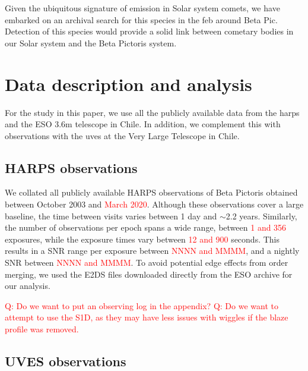 \documentclass{aa}
\newcommand{\bp}{Beta Pictoris}
\begin{document}
Given the ubiquitous signature of  emission in Solar system comets, we have embarked on an archival search for this species in the \ac{feb} around Beta Pic.
%
Detection of this species would provide a solid link between cometary bodies in our Solar system and the \bp{} system.

\section{Data description and analysis}

For the study in this paper, we use all the publicly available data from the \ac{harps} and the ESO 3.6m telescope in Chile.
%
In addition, we complement this with observations with the \ac{uves} at the Very Large Telescope in Chile. 

\subsection{HARPS observations}

We collated all publicly available HARPS observations of \bp{} obtained between October 2003 and \textcolor{red}{March 2020}.
%
Although these observations cover a large baseline, the time between visits varies between 1 day and $\sim$2.2 years.
%
Similarly, the number of observations per epoch spans a wide range, between \textcolor{red}{1 and 356} exposures, while the exposure times vary between \textcolor{red}{12 and 900} seconds. This results in a SNR range per exposure between \textcolor{red}{NNNN and MMMM}, and a nightly SNR between \textcolor{red}{NNNN and MMMM}.
%
To avoid potential edge effects from order merging,  we used the E2DS files downloaded directly from the ESO archive for our analysis.

\textcolor{red}{Q: Do we want to put an observing log in the appendix?}
\textcolor{red}{Q: Do we want to attempt to use the S1D, as they may have less issues with wiggles if the blaze profile was removed.}



\subsection{UVES observations}
\end{document}
